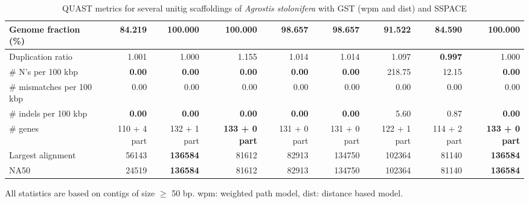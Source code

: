 \documentclass[12pt]{article}
\begin{document}
\begin{table}[h!]
\begin{center}
{\begin{tabular}{|l*{8}{|r}|}
Genome fraction (\%) & 84.219 & {\bf 100.000} & {\bf 100.000} & 98.657 & 98.657 & 91.522 & 84.590 & {\bf 100.000} \\ \hline
Duplication ratio & 1.001 & 1.000 & 1.155 & 1.014 & 1.014 & 1.097 & {\bf 0.997} & 1.000 \\ \hline
\# N's per 100 kbp & {\bf 0.00} & {\bf 0.00} & {\bf 0.00} & {\bf 0.00} & {\bf 0.00} & 218.75 & 12.15 & {\bf 0.00} \\ \hline
\# mismatches per 100 kbp & 0.00 & 0.00 & 0.00 & 0.00 & 0.00 & 0.00 & 0.00 & 0.00 \\ \hline
\# indels per 100 kbp & {\bf 0.00} & {\bf 0.00} & {\bf 0.00} & {\bf 0.00} & {\bf 0.00} & 5.60 & 0.87 & {\bf 0.00} \\ \hline
\# genes & 110 + 4 part & 132 + 1 part & {\bf 133 + 0 part} & 131 + 0 part & 131 + 0 part & 122 + 1 part & 114 + 2 part & {\bf 133 + 0 part} \\ \hline
Largest alignment & 56143 & {\bf 136584} & 81612 & 82913 & 134750 & 102364 & 81140 & {\bf 136584} \\ \hline
NA50 & 24519 & {\bf 136584} & 81612 & 82913 & 134750 & 102364 & 81140 & {\bf 136584} \\ \hline
\end{tabular}
}
\end{center}
\footnotesize All statistics are based on contigs of size $\geq$ 50 bp. {\color{magenta}wpm}: weighted path model, {\color{magenta}dist}: distance based model.
\caption{QUAST metrics for several unitig scaffoldings of \textit{Agrostis stolonifera} with GST (wpm and dist) and SSPACE}
\label{tab:agro}
\end{table}
\end{document}
